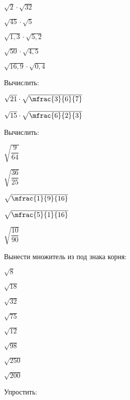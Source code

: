 \begin{class}[number=3]
\begin{listofex}
		\begin{enumcols}[itemcolumns=5]
			\item \( \sqrt{2}\cdot\sqrt{32} \)
			\item \( \sqrt{45}\cdot\sqrt{5} \)
			\item \( \sqrt{1,3}\cdot\sqrt{5,2} \)
			\item \( \sqrt{50}\cdot\sqrt{4,5} \)
			\item \( \sqrt{16,9}\cdot\sqrt{0,4} \)
		\end{enumcols}
		\item Вычислить:
		\begin{enumcols}[itemcolumns=4]
			\item \( \sqrt{21}\cdot\sqrt{\mfrac{3}{6}{7}} \)
			\item \( \sqrt{15}\cdot\sqrt{\mfrac{6}{2}{3}} \)
			\item {}
			\item {}
		\end{enumcols}
		\item Вычислить:
		\begin{enumcols}[itemcolumns=4]
			\item \( \sqrt{\dfrac{9}{64}} \)
			\item \( \sqrt{\dfrac{36}{25}} \)
			\item \( \sqrt{\mfrac{1}{9}{16}} \)
			\item \( \sqrt{\mfrac{5}{1}{16}} \)
			\item \( \sqrt{\dfrac{10}{90}} \)
			\item {}
			\item {}
			\item {}
		\end{enumcols}
		\newpage
		\item Вынести множитель из под знака корня:
		\begin{enumcols}[itemcolumns=8]
			\item \( \sqrt{8} \)
			\item \( \sqrt{18} \)
			\item \( \sqrt{32} \)
			\item \( \sqrt{75} \)
			\item \( \sqrt{12} \)
			\item \( \sqrt{98} \)
			\item \( \sqrt{250} \)
			\item \( \sqrt{200} \)
		\end{enumcols}
		\item Упростить:

\end{listofex}
\end{class}
